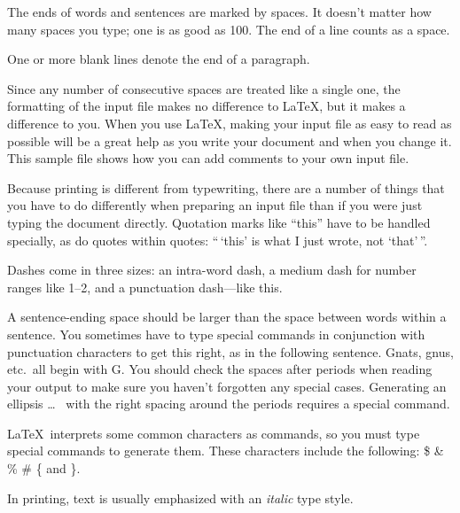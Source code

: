 The ends  of words and sentences are marked by spaces. It doesn't matter how many 
spaces    you type; one is as good as 100.  The
end of   a line counts as a space.

One   or more   blank lines denote the  end 
of  a paragraph.  

Since any number of consecutive spaces are treated
like a single one, the formatting of the input
file makes no difference to
\LaTeX,                %
but it makes a difference to you.  When you use 
\LaTeX \cite{lamport94},  %
making your input file as easy to read
as possible will be a great help as you write 
your document and when you change it.  This sample 
file shows how you can add comments to your own input 
file.

Because printing is different from typewriting,
there are a number of things that you have to do
differently when preparing an input file than if
you were just typing the document directly.
Quotation marks like
``this'' 
have to be handled specially, as do quotes within
quotes:
``\,`this'            %
is what I just 
wrote, not  `that'\,''.  

Dashes come in three sizes: an 
intra-word 
dash, a medium dash for number ranges like 
1--2, 
and a punctuation 
dash---like 
this.

A sentence-ending space should be larger than the
space between words within a sentence.  You
sometimes have to type special commands in
conjunction with punctuation characters to get
this right, as in the following sentence.
Gnats, gnus, etc.\ all  %
begin with G\@.         %
You should check the spaces after periods when
reading your output to make sure you haven't
forgotten any special cases.  Generating an
ellipsis
\ldots\               %
%
%
with the right spacing around the periods requires
a special command.

\LaTeX\ interprets some common characters as
commands, so you must type special commands to
generate them.  These characters include the
following:
\$ \& \% \# \{ and \}.

In printing, text is usually emphasized with an
\emph{italic}  
type style.  

